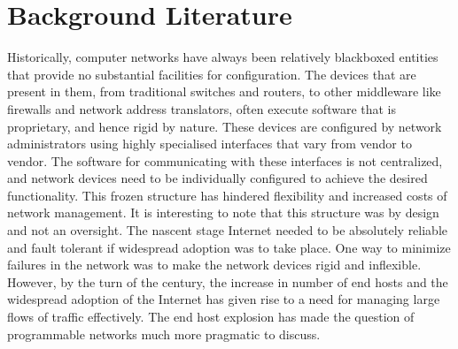 
\chapter{Background Literature} %

\label{Chapter2} %



Historically, computer networks have always been relatively blackboxed entities that provide no substantial
facilities for configuration. The devices that are present in them, from traditional switches and routers, to other
middleware like firewalls and network address translators, often execute software that is proprietary, and hence
rigid by nature. These devices are configured by network administrators using highly specialised interfaces that vary from vendor to 
vendor. The software for communicating with these interfaces is not centralized, and network devices need to be
individually configured to achieve the desired functionality. This frozen structure has hindered flexibility and
increased costs of network management.
\newline
It is interesting to note that this structure was by design and not an oversight. The nascent stage Internet needed to
be absolutely reliable and fault tolerant if widespread adoption was to take place. One way to minimize failures in the network was
to make the network devices rigid and inflexible. However, by the turn of the century, the increase in number of end 
hosts and the widespread adoption of the Internet has given rise to a need for managing large flows of traffic effectively.
The end host explosion has made the question of programmable networks much more pragmatic to discuss.



